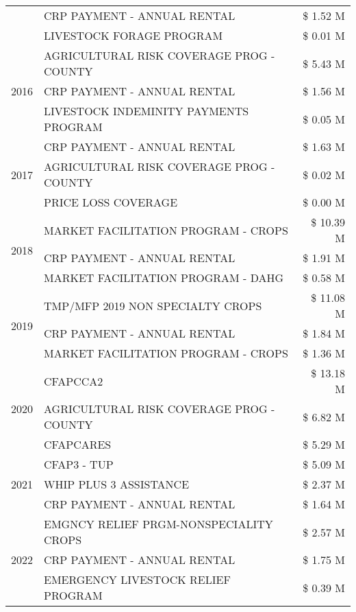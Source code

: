 \begin{tabular}{llr}
 & CRP PAYMENT - ANNUAL RENTAL & \$ 1.52 M \\
 & LIVESTOCK FORAGE PROGRAM & \$ 0.01 M \\
\cline{1-3}
\multirow[t]{3}{*}{2016} & AGRICULTURAL RISK COVERAGE PROG - COUNTY & \$ 5.43 M \\
 & CRP PAYMENT - ANNUAL RENTAL & \$ 1.56 M \\
 & LIVESTOCK INDEMINITY PAYMENTS PROGRAM & \$ 0.05 M \\
\cline{1-3}
\multirow[t]{3}{*}{2017} & CRP PAYMENT - ANNUAL RENTAL & \$ 1.63 M \\
 & AGRICULTURAL RISK COVERAGE PROG - COUNTY & \$ 0.02 M \\
 & PRICE LOSS COVERAGE & \$ 0.00 M \\
\cline{1-3}
\multirow[t]{3}{*}{2018} & MARKET FACILITATION PROGRAM - CROPS & \$ 10.39 M \\
 & CRP PAYMENT - ANNUAL RENTAL & \$ 1.91 M \\
 & MARKET FACILITATION PROGRAM - DAHG & \$ 0.58 M \\
\cline{1-3}
\multirow[t]{3}{*}{2019} & TMP/MFP 2019 NON SPECIALTY CROPS & \$ 11.08 M \\
 & CRP PAYMENT - ANNUAL RENTAL & \$ 1.84 M \\
 & MARKET FACILITATION PROGRAM - CROPS & \$ 1.36 M \\
\cline{1-3}
\multirow[t]{3}{*}{2020} & CFAPCCA2 & \$ 13.18 M \\
 & AGRICULTURAL RISK COVERAGE PROG - COUNTY & \$ 6.82 M \\
 & CFAPCARES & \$ 5.29 M \\
\cline{1-3}
\multirow[t]{3}{*}{2021} & CFAP3 - TUP & \$ 5.09 M \\
 & WHIP PLUS 3 ASSISTANCE & \$ 2.37 M \\
 & CRP PAYMENT - ANNUAL RENTAL & \$ 1.64 M \\
\cline{1-3}
\multirow[t]{3}{*}{2022} & EMGNCY RELIEF PRGM-NONSPECIALITY CROPS & \$ 2.57 M \\
 & CRP PAYMENT - ANNUAL RENTAL & \$ 1.75 M \\
 & EMERGENCY LIVESTOCK RELIEF PROGRAM & \$ 0.39 M \\
\cline{1-3}
\bottomrule
\end{tabular}

